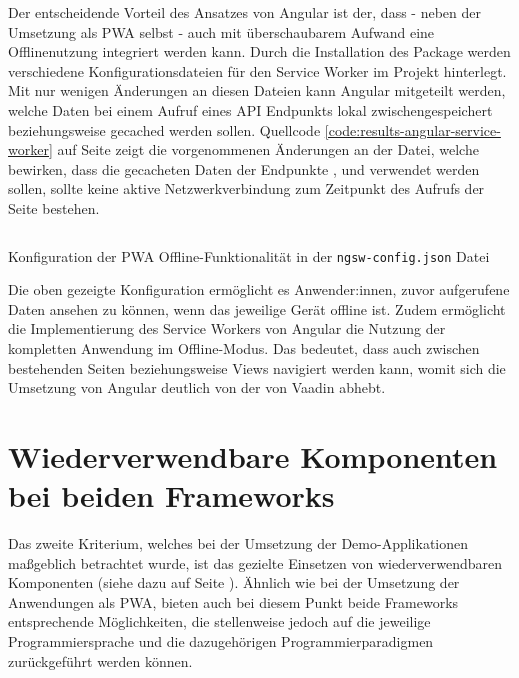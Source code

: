 \documentclass[a4paper,12pt,twoside]{scrreprt}
\begin{document}
Der entscheidende Vorteil des Ansatzes von Angular ist der, dass - neben der Umsetzung als \ac{PWA} selbst - auch mit überschaubarem Aufwand eine Offlinenutzung integriert werden kann. Durch die Installation des  Package werden verschiedene Konfigurationsdateien für den Service Worker im Projekt hinterlegt. Mit nur wenigen Änderungen an diesen Dateien kann Angular mitgeteilt werden, welche Daten bei einem Aufruf eines API Endpunkts lokal zwischengespeichert beziehungsweise gecached werden sollen. Quellcode \ref{code:results-angular-service-worker} auf Seite \pageref{code:results-angular-service-worker} zeigt die vorgenommenen Änderungen an der  Datei, welche bewirken, dass die gecacheten Daten der Endpunkte ,  und  verwendet werden sollen, sollte keine aktive Netzwerkverbindung zum Zeitpunkt des Aufrufs der Seite bestehen.

\begin{listing}[ht]
    \renewcommand{\fcolorbox}[4][]{#4}
    \inputminted[fontsize=\footnotesize,linenos,breaklines]{json}{code/Luidold_Results-Angular-ServiceWorker.json}
    \caption[Konfiguration der \ac{PWA} Offline-Funktionalität in der \texttt{ngsw-config.json} Datei]{Konfiguration der \ac{PWA} Offline-Funktionalität in der \texttt{ngsw-config.json} Datei}
    \label{code:results-angular-service-worker}
\end{listing}

Die oben gezeigte Konfiguration ermöglicht es Anwender:innen, zuvor aufgerufene Daten ansehen zu können, wenn das jeweilige Gerät offline ist. Zudem ermöglicht die Implementierung des Service Workers von Angular die Nutzung der kompletten Anwendung im Offline-Modus. Das bedeutet, dass auch zwischen bestehenden Seiten beziehungsweise Views navigiert werden kann, womit sich die Umsetzung von Angular deutlich von der von Vaadin abhebt.

\section{Wiederverwendbare Komponenten bei beiden Frameworks}
\label{sec:ergebnisse-wiederverwendbarkeit}
Das zweite Kriterium, welches bei der Umsetzung der Demo-Applikationen maßgeblich betrachtet wurde, ist das gezielte Einsetzen von wiederverwendbaren Komponenten (siehe dazu \textit{} auf Seite \pageref{sub-sec:kriterien-web-components}). Ähnlich wie bei der Umsetzung der Anwendungen als \ac{PWA}, bieten auch bei diesem Punkt beide Frameworks entsprechende Möglichkeiten, die stellenweise jedoch auf die jeweilige Programmiersprache und die dazugehörigen Programmierparadigmen zurückgeführt werden können.
\end{document}
